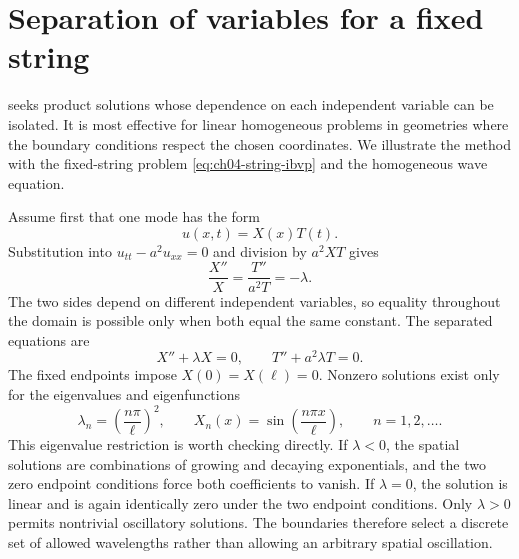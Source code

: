 \section{Separation of variables for a fixed string}

 seeks product solutions whose dependence on each independent variable can be isolated. It is most effective for linear homogeneous problems in geometries where the boundary conditions respect the chosen coordinates. We illustrate the method with the fixed-string problem \eqref{eq:ch04-string-ibvp} and the homogeneous wave equation.

Assume first that one mode has the form
\begin{equation}
u(x,t)=X(x)T(t).
\end{equation}
Substitution into $u_{tt}-a^2u_{xx}=0$ and division by $a^2XT$ gives
\begin{equation}
\frac{X''}{X}=\frac{T''}{a^2T}=-\lambda.
\end{equation}
The two sides depend on different independent variables, so equality throughout the domain is possible only when both equal the same constant. The separated equations are
\begin{equation}
X''+\lambda X=0,
\qquad
T''+a^2\lambda T=0.
\end{equation}
The fixed endpoints impose $X(0)=X(\ell)=0$. Nonzero solutions exist only for the eigenvalues and eigenfunctions
\begin{equation}
\lambda_n=\left(\frac{n\pi}{\ell}\right)^2,
\qquad
X_n(x)=\sin\left(\frac{n\pi x}{\ell}\right),
\qquad n=1,2,\ldots.
\end{equation}
This eigenvalue restriction is worth checking directly. If $\lambda<0$, the spatial solutions are combinations of growing and decaying exponentials, and the two zero endpoint conditions force both coefficients to vanish. If $\lambda=0$, the solution is linear and is again identically zero under the two endpoint conditions. Only $\lambda>0$ permits nontrivial oscillatory solutions. The boundaries therefore select a discrete set of allowed wavelengths rather than allowing an arbitrary spatial oscillation.

